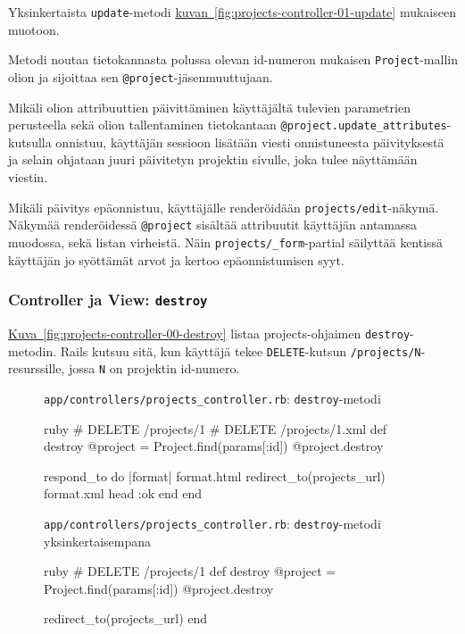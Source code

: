 \documentclass{article}
\newenvironment{myfigure}[1][tbp]{
  \begin{figure}[#1]
    \centering
    \begin{lrbox}{\myfigurebox}
      \begin{minipage}{\textwidth}
}{
      \end{minipage}
    \end{lrbox}
    \colorbox{blue!4}{\usebox{\myfigurebox}}
  \end{figure}
}
\newcommand{\myref}[2]{\hyperref[#2]{#1~\ref*{#2}}}
\newcommand{\pdfforeignlanguage}[2]{\texorpdfstring{\foreignlanguage{#1}{#2}}{#2}}
\newcommand{\eng}[1]{\pdfforeignlanguage{english}{#1}}
\begin{document}
Yksinkertaista \texttt{update}-metodi
\myref{kuvan}{fig:projects-controller-01-update} mukaiseen muotoon.

Metodi noutaa tietokannasta polussa olevan id-numeron mukaisen
\texttt{Project}-mallin olion ja sijoittaa sen
\texttt{@project}-jäsenmuuttujaan.

Mikäli olion attribuuttien päivittäminen käyttäjältä tulevien parametrien
perusteella sekä olion tallentaminen tietokantaan
\texttt{@project.update\_attributes}-kutsulla onnistuu, käyttäjän sessioon
lisätään viesti onnistuneesta päivityksestä ja selain ohjataan juuri päivitetyn
projektin sivulle, joka tulee näyttämään viestin.

Mikäli päivitys epäonnistuu, käyttäjälle renderöidään
\texttt{projects/edit}-näkymä. Näkymää renderöidessä \texttt{@project} sisältää
attribuutit käyttäjän antamassa muodossa, sekä listan virheistä. Näin
\texttt{projects/\_form}-\eng{partial} säilyttää kentissä käyttäjän jo
syöttämät arvot ja kertoo epäonnistumisen syyt.

\subsubsection{\eng{Controller} ja \eng{View}: \texttt{destroy}}

\begin{samepage}
\myref{Kuva}{fig:projects-controller-00-destroy} listaa projects-ohjaimen
\texttt{destroy}-metodin. Rails kutsuu sitä, kun käyttäjä tekee
\texttt{DELETE}-kutsun \texttt{/projects/N}-resurssille, jossa \texttt{N} on
projektin id-numero.

\begin{myfigure}[H]
\caption{\texttt{app/controllers/projects\_controller.rb}:
\texttt{destroy}-metodi}
\label{fig:projects-controller-00-destroy}

\begin{pygmented}{ruby}
  # DELETE /projects/1
  # DELETE /projects/1.xml
  def destroy
    @project = Project.find(params[:id])
    @project.destroy

    respond_to do |format|
      format.html { redirect_to(projects_url) }
      format.xml  { head :ok }
    end
  end
\end{pygmented}

\caption{\texttt{app/controllers/projects\_controller.rb}:
\texttt{destroy}-metodi yksinkertaisempana}
\label{fig:projects-controller-01-destroy}

\begin{pygmented}{ruby}
  # DELETE /projects/1
  def destroy
    @project = Project.find(params[:id])
    @project.destroy

    redirect_to(projects_url)
  end
\end{pygmented}
\end{myfigure}
\end{samepage}
\end{document}
